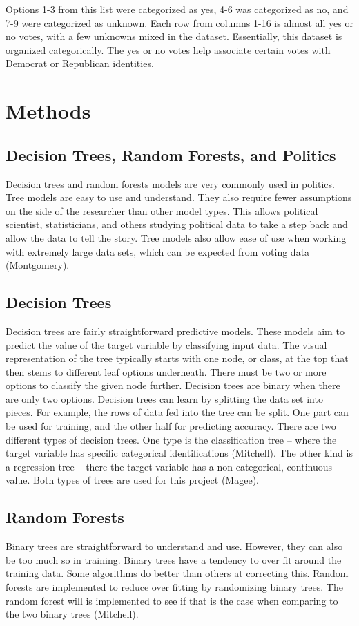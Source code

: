 \documentclass{article}
\begin{document}
Options 1-3 from this list were categorized as yes, 4-6 was categorized as no, and 7-9 were categorized as unknown. Each row from columns 1-16 is almost all yes or no votes, with a few unknowns mixed in the dataset. Essentially, this dataset is organized categorically. The yes or no votes help associate certain votes with Democrat or Republican identities.


%
\section{Methods}
\subsection{Decision Trees, Random Forests, and Politics}
    Decision trees and random forests models are very commonly used in politics.  Tree models are easy to use and understand. They also require fewer assumptions on the side of the researcher than other model types. This allows political scientist, statisticians, and others studying political data to take a step back and allow the data to tell the story. Tree models also allow ease of use when working with extremely large data sets, which can be expected from voting data (Montgomery).
\subsection{Decision Trees}
    Decision trees are fairly straightforward predictive models. These models aim to predict the value of the target variable by classifying input data. The visual representation of the tree typically starts with one node, or class, at the top that then stems to different leaf options underneath. There must be two or more options to classify the given node further. Decision trees are binary when there are only two options. Decision trees can learn by splitting the data set into pieces. For example, the rows of data fed into the tree can be split. One part can be used for training, and the other half for predicting accuracy. There are two different types of decision trees. One type is the classification tree – where the target variable has specific categorical identifications (Mitchell). The other kind is a regression tree – there the target variable has a non-categorical, continuous value. Both types of trees are used for this project (Magee).
    \pagebreak{}
\subsection{Random Forests}
    Binary trees are straightforward to understand and use. However, they can also be too much so in training. Binary trees have a tendency to over fit around the training data. Some algorithms do better than others at correcting this. Random forests are implemented to reduce over fitting by randomizing binary trees. The random forest will is implemented to see if that is the case when comparing to the two binary trees (Mitchell).
\end{document}
